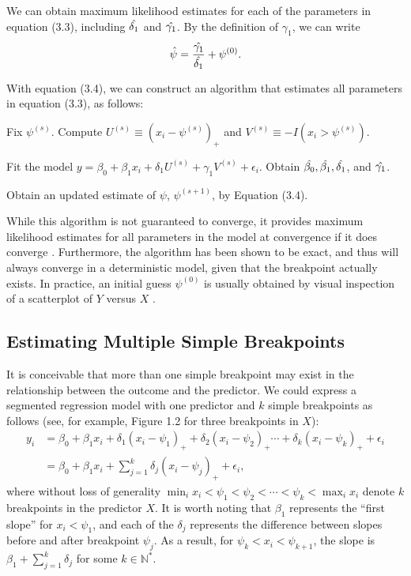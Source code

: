 \documentclass [12pt, proquest] {uwthesis}[2016/11/22]
\begin{document}
We can obtain maximum likelihood estimates for each of the parameters in equation (3.3), including $\Hat{\delta_1}$ and $\Hat{\gamma_1}$. By the definition of $\gamma_1$, we can write
\begin{align}
    \Hat{\psi} = \dfrac{\Hat{\gamma_1}}{\Hat{\delta_1}} + \psi^{(0)}.
\end{align}

With equation (3.4), we can construct an algorithm that estimates all parameters in equation (3.3), as follows:

\begin{enumerate}
\begin{mybox}
    \item Fix $\psi^{(s)}$. Compute $U^{(s)} \equiv (x_i - \psi^{(s)})_+$ and $V^{(s)} \equiv -I(x_i > \psi^{(s)})$.
    \item Fit the model $y = \beta_0 + \beta_1 x_i + \delta_1 U^{(s)} + \gamma_1 V^{(s)} + \epsilon_i$. Obtain $\Hat{\beta_0}, \Hat{\beta_1}, \Hat{\delta_1}$, and $\Hat{\gamma_1}$.
    \item Obtain an updated estimate of $\psi$, $\psi^{(s+1)}$, by Equation (3.4).
\end{mybox}
\end{enumerate}

While this algorithm is not guaranteed to converge, it provides maximum likelihood estimates for all parameters in the model at convergence if it does converge \cite{BT1962}. Furthermore, the algorithm has been shown to be exact, and thus will always converge in a deterministic model, given that the breakpoint actually exists. In practice, an initial guess $\psi^{(0)}$ is usually obtained by visual inspection of a scatterplot of $Y$ versus $X$ \cite{VM2003}.

\subsection{Estimating Multiple Simple Breakpoints}

It is conceivable that more than one simple breakpoint may exist in the relationship between the outcome and the predictor. We could express a segmented regression model with one predictor and $k$ simple breakpoints as follows (see, for example, Figure 1.2 for three breakpoints in $X$):
\begin{align}
    y_i &= \beta_0 + \beta_1 x_i + \delta_1 (x_i - \psi_1)_+ + \delta_2 (x_i - \psi_2)_+ \cdots + \delta_k (x_i - \psi_k)_+ + \epsilon_i \nonumber \\
      &= \beta_0 + \beta_1 x_i + \sum_{j = 1}^k \delta_j (x_i - \psi_j)_+ + \epsilon_i,
\end{align}
where without loss of generality $\min_i x_i < \psi_1 < \psi_2 < \cdots < \psi_k < \max_i x_i$ denote $k$ breakpoints in the predictor $X$. It is worth noting that $\beta_1$ represents the ``first slope'' for $x_i < \psi_1$, and each of the $\delta_j$ represents the difference between slopes before and after breakpoint $\psi_j$. As a result, for $\psi_k < x_i < \psi_{k+1}$, the slope is $\beta_1 + \sum_{j=1}^k \delta_j$ for some $k \in \mathbb{N}^*$.
\end{document}

